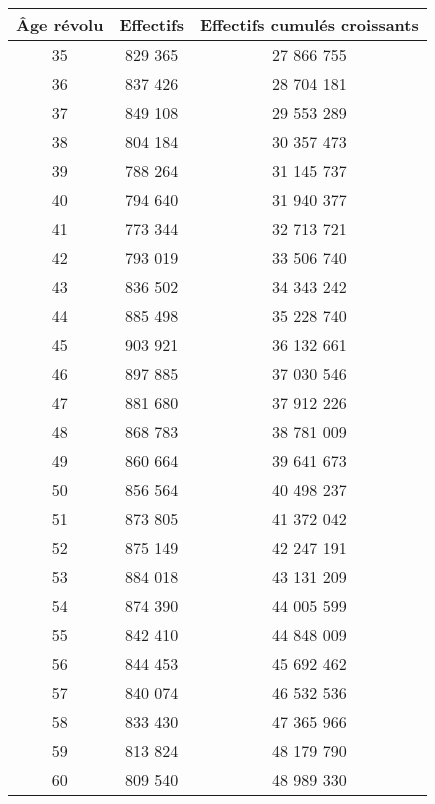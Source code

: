 \begin{center}
     \begin{tabular}{|c|c|c|}\hline %
         Âge révolu  & Effectifs &  Effectifs cumulés croissants \\ \hline
          35  &  829 365  &  27 866 755 \\ \hline
          36  &  837 426  &  28 704 181 \\ \hline
          37  &  849 108  &  29 553 289 \\ \hline
          38  &  804 184  &  30 357 473 \\ \hline
          39  &  788 264  &  31 145 737 \\ \hline
          40  &  794 640  &  31 940 377 \\ \hline
          41  &  773 344  &  32 713 721 \\ \hline
          42  &  793 019  &  33 506 740 \\ \hline
          43  &  836 502  &  34 343 242 \\ \hline
          44  &  885 498  &  35 228 740 \\ \hline
          45  &  903 921  &  36 132 661 \\ \hline
          46  &  897 885  &  37 030 546 \\ \hline
          47  &  881 680  &  37 912 226 \\ \hline
          48  &  868 783  &  38 781 009 \\ \hline
          49  &  860 664  &  39 641 673 \\ \hline
          50  &  856 564  &  40 498 237 \\ \hline
          51  &  873 805  &  41 372 042 \\ \hline
          52  &  875 149  &  42 247 191 \\ \hline
          53  &  884 018  &  43 131 209 \\ \hline
          54  &  874 390  &  44 005 599 \\ \hline
          55  &  842 410  &  44 848 009 \\ \hline
          56  &  844 453  &  45 692 462 \\ \hline
          57  &  840 074  &  46 532 536 \\ \hline
          58  &  833 430  &  47 365 966 \\ \hline
          59  &  813 824  &  48 179 790 \\ \hline
          60  &  809 540  &  48 989 330 \\ \hline

\end{tabular}
\end{center}
